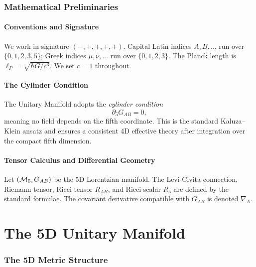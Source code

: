 \documentclass[12pt,a4paper]{article}
\newcommand{\lP}{\ell_P}           %
\begin{document}
\section{Mathematical Preliminaries}
\label{sec:math-prelim}

\subsection{Conventions and Signature}

We work in signature $(-,+,+,+,+)$.  Capital Latin indices $A,B,\ldots$ run
over $\{0,1,2,3,5\}$; Greek indices $\mu,\nu,\ldots$ run over $\{0,1,2,3\}$.
The Planck length is $\lP = \sqrt{\hbar G/c^3}$.  We set $c=1$ throughout.

\subsection{The Cylinder Condition}

The Unitary Manifold adopts the \emph{cylinder condition}
\begin{equation}
  \partial_5 G_{AB} = 0,
  \label{eq:cylinder}
\end{equation}
meaning no field depends on the fifth coordinate.  This is the standard
Kaluza--Klein ansatz \citep{Kaluza1921,Klein1926} and ensures a consistent
4D effective theory after integration over the compact fifth dimension.

\subsection{Tensor Calculus and Differential Geometry}

Let $({\cal M}_5, G_{AB})$ be the 5D Lorentzian manifold.  The Levi-Civita
connection, Riemann tensor, Ricci tensor $R_{AB}$, and Ricci scalar $R_5$ are
defined by the standard formulae.  The covariant derivative compatible with
$G_{AB}$ is denoted $\nabla_A$.

\part{The 5D Unitary Manifold}

\section{The 5D Metric Structure}
\label{sec:metric}
\end{document}
